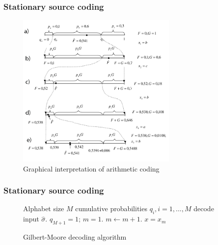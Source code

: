 \documentclass[14pt]{beamer}
\begin{document}
\begin{frame}
\frametitle{Stationary source coding}   

\begin{figure}[htbp]
\begin{minipage}{0.9\linewidth}
\includegraphics[width=0.7\textwidth]{fig2_9.png}
\caption{Graphical interpretation of arithmetic coding }
\label{AC_graph}
\end{minipage}
\end{figure}

\end{frame}



\begin{frame}
\frametitle{Stationary source coding}   

    \begin{center}
    \begin{figure}
    \begin{algorithm}[H]
    \dontprintsemicolon
      \KwIn
      {
       Alphabet size $M$
       cumulative probabilities $q_i, i=1,...,M$\;
       decode input $\hat {\sigma }$.
       }
      \BlankLine
      $q_{M+1}=1$;
      $m = 1$.\;
      \BlankLine
      {
        $m \leftarrow m + 1$.
      }
      \BlankLine
      $x=x_m$
      \end{algorithm}
    \caption{Gilbert-Moore decoding algorithm}
    \label{Alg_dec_GM}
    \end{figure}
    \end{center}
\end{frame}
\end{document}

